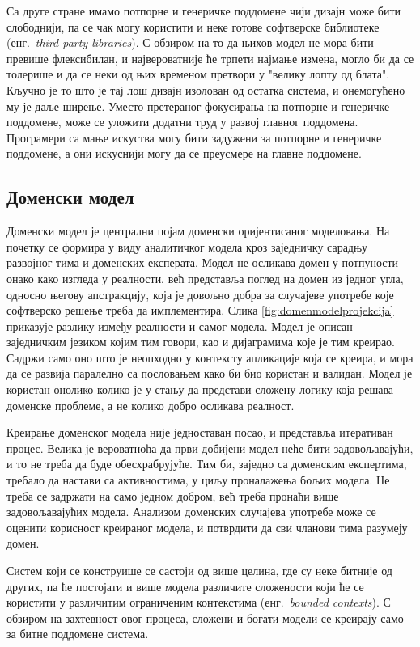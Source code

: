 \documentclass[12pt,oneside]{memoir}
\begin{document}
Са друге стране имамо потпорне и генеричке поддомене чији дизајн може бити слободнији, па се чак могу користити и неке готове софтверске библиотеке (енг.~\textit{third party libraries}). С обзиром на то да њихов модел не мора бити превише флексибилан, и највероватније ће трпети најмање измена, могло би да се толерише и да се неки од њих временом претвори у "велику лопту од блата". Кључно је то што је тај лош дизајн изолован од остатка система, и онемогућено му је даље ширење. Уместо претераног фокусирања на потпорне и генеричке поддомене, може се уложити додатни труд у развој главног поддомена. Програмери са мање искуства могу бити задужени за потпорне и генеричке поддомене, а они искуснији могу да се преусмере на главне поддомене.

\subsection{Доменски модел}
Доменски модел је централни појам доменски оријентисаног моделовања. На почетку се формира у виду аналитичког модела кроз заједничку сарадњу развојног тима и доменских експерата. Модел не осликава домен у потпуности онако како изгледа у реалности, већ представља поглед на домен из једног угла, односно његову апстракцију, која је довољно добра за случајеве употребе које софтверско решење треба да имплементира. Слика \ref{fig:domenmodelprojekcija} приказује разлику између реалности и самог модела. Модел је описан заједничким језиком којим тим говори, као и дијаграмима које је тим креирао. Садржи само оно што је неопходно у контексту апликације која се креира, и мора да се развија паралелно са пословањем како би био користан и валидан. Модел је користан онолико колико је у стању да представи сложену логику која решава доменске проблеме, а не колико добро осликава реалност.

Креирање доменског модела није једноставан посао, и представља итеративан процес. Велика је вероватноћа да први добијени модел неће бити задовољавајући, и то не треба да буде обесхрабрујуће. Тим би, заједно са доменским експертима, требало да настави са активностима, у циљу проналажења бољих модела. Не треба се задржати на само једном добром, већ треба пронаћи више задовољавајућих модела. Анализом доменских случајева употребе може се оценити корисност креираног модела, и потврдити да сви чланови тима разумеју домен.

Систем који се конструише се састоји од више целина, где су неке битније од других, па ће постојати и више модела различите сложености који ће се користити у различитим ограниченим контекстима (енг.~\textit{bounded contexts}). С обзиром на захтевност овог процеса, сложени и богати модели се креирају само за битне поддомене система. 
\end{document}

